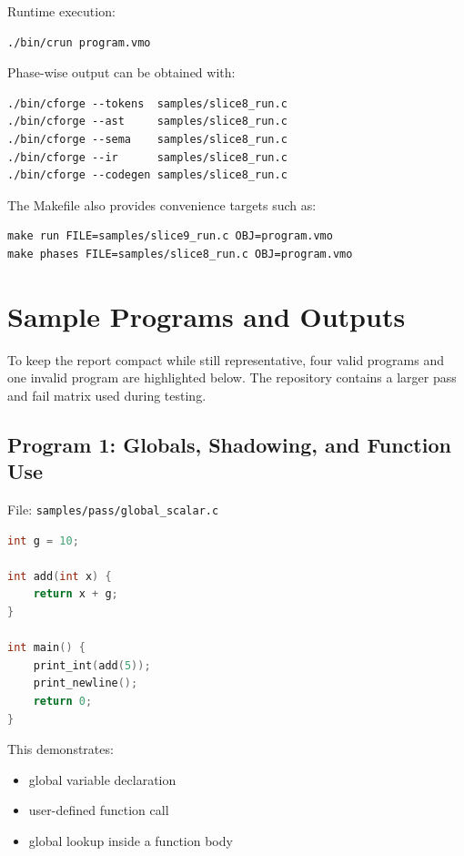 \documentclass[11pt,a4paper]{article}
\begin{document}
Runtime execution:

\begin{lstlisting}
./bin/crun program.vmo
\end{lstlisting}

Phase-wise output can be obtained with:

\begin{lstlisting}
./bin/cforge --tokens  samples/slice8_run.c
./bin/cforge --ast     samples/slice8_run.c
./bin/cforge --sema    samples/slice8_run.c
./bin/cforge --ir      samples/slice8_run.c
./bin/cforge --codegen samples/slice8_run.c
\end{lstlisting}

The Makefile also provides convenience targets such as:

\begin{lstlisting}
make run FILE=samples/slice9_run.c OBJ=program.vmo
make phases FILE=samples/slice8_run.c OBJ=program.vmo
\end{lstlisting}

\section{Sample Programs and Outputs}

To keep the report compact while still representative, four valid programs and
one invalid program are highlighted below. The repository contains a larger pass
and fail matrix used during testing.

\subsection*{Program 1: Globals, Shadowing, and Function Use}

File: \texttt{samples/pass/global\_scalar.c}

\begin{lstlisting}[language=C]
int g = 10;

int add(int x) {
    return x + g;
}

int main() {
    print_int(add(5));
    print_newline();
    return 0;
}
\end{lstlisting}

This demonstrates:

\begin{itemize}[leftmargin=2em]
    \item global variable declaration
    \item user-defined function call
    \item global lookup inside a function body
\end{itemize}
\end{document}

